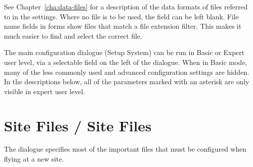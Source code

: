 See Chapter~\ref{cha:data-files} for a description of the data formats
of files referred to in the settings.  Where no file is to be used,
the field can be left blank.  File name fields in forms show files
that match a file extension filter.  This makes it much easier to find
and select the correct file.

The main configuration dialogue (Setup System) can be run in Basic or
Expert user level, via a selectable field on the left of the dialogue.
When in Basic mode, many of the less commonly used and advanced
configuration settings are hidden.  In the descriptions below,
all of the parameters marked with an asterisk are only visible in
expert user level. 

\section{Site Files / Site Files}\label{sec:site-files}
The dialogue specifies most of the important files that must be
configured when flying at a new site.

